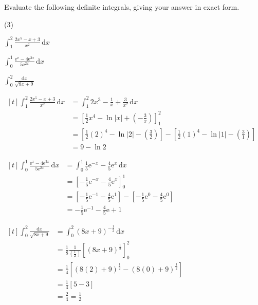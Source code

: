 \documentclass[11pt,a4paper]{book}
\begin{document}
\begin{example}

Evaluate the following definite integrals, giving your answer in exact
form.

\begin{tasks}[label=(\alph*),label-width=3.5ex](3)

\task ${\displaystyle \int_{1}^{2}\frac{2x^{5}-x+3}{x^{2}}\,\mathrm{d}x}$

\task ${\displaystyle \int_{0}^{1}\frac{\mathrm{e}^{x}-4\mathrm{e}^{3x}}{5\mathrm{e}^{2x}}\,\mathrm{d}x}$

\task ${\displaystyle \int_{0}^{2}\frac{\mathrm{d}x}{\sqrt{8x+9}}}$


\end{tasks}

\Solution

\begin{tasks}[label=(\alph*),label-width=3.5ex,after-item-skip=1cm]

\task
$
\begin{aligned}[t]
{\displaystyle \int_{1}^{2}\frac{2x^{5}-x+3}{x^{2}}\,\mathrm{d}x} & =\int_{1}^{2}2x^{3}-\frac{1}{x}+\frac{3}{x^{2}}\,\mathrm{d}x\\
 & =\left[\frac{1}{2}x^{4}-\ln\left|x\right|+\left(-\frac{3}{x}\right)\right]_{1}^{2}\\
 & =\left[\frac{1}{2}(2)^{4}-\ln\left|2\right|-\left(\frac{3}{2}\right)\right]-\left[\frac{1}{2}(1)^{4}-\ln\left|1\right|-\left(\frac{3}{1}\right)\right]\\
 & =9-\ln2
\end{aligned}
$

\task
$
\begin{aligned}[t]
{\displaystyle \int_{0}^{1}\frac{\mathrm{e}^{x}-4\mathrm{e}^{3x}}{5\mathrm{e}^{2x}}\,\mathrm{d}x} & =\int_{0}^{1}\frac{1}{5}\mathrm{e}^{-x}-\frac{4}{5}\mathrm{e}^{x}\,\mathrm{d}x\\
 & =\left[-\frac{1}{5}\mathrm{e}^{-x}-\frac{4}{5}\mathrm{e}^{x}\right]_{0}^{1}\\
 & =\left[-\frac{1}{5}\mathrm{e}^{-1}-\frac{4}{5}\mathrm{e}^{1}\right]-\left[-\frac{1}{5}\mathrm{e}^{0}-\frac{4}{5}\mathrm{e}^{0}\right]\\
 & =-\frac{1}{5}\mathrm{e}^{-1}-\frac{4}{5}\mathrm{e}+1
\end{aligned}
$

\task$
\begin{aligned}[t]
\int_{0}^{2}\frac{\mathrm{d}x}{\sqrt{8x+9}} & =\int_{0}^{2}(8x+9)^{-\frac{1}{2}}\,\mathrm{d}x\\
 & =\frac{1}{8}\frac{1}{\left(\frac{1}{2}\right)}\left[\left(8x+9\right)^{\frac{1}{2}}\right]_{0}^{2}\\
 & =\frac{1}{4}\left[\left(8(2)+9\right)^{\frac{1}{2}}-\left(8(0)+9\right)^{\frac{1}{2}}\right]\\
 & =\frac{1}{4}[5-3]\\
 & =\frac{2}{4}=\frac{1}{2}
\end{aligned}
$


\end{tasks}

\end{example}
\end{document}
